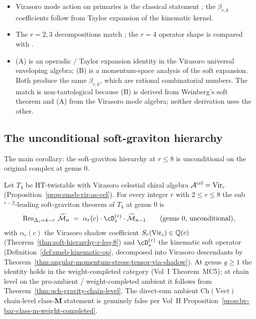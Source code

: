 \begin{remark}
\label{rem:smsb-hziv-ang-stress}
\begin{itemize}
\item[(A)] Virasoro mode action on primaries is the classical statement
\cite{DiFrancescoMathieuSenechal97}; the $\beta_{r, k}$ coefficients
follow from Taylor expansion of the kinematic kernel.
\item[(B)] The $r = 2, 3$ decompositions match
\cite{Weinberg65,CachazoStrominger14,StromingerLectures2018};
the $r = 4$ operator shape is compared with
\cite{HamadaShiuSubsubSoft}.
\item[(C)] (A) is an operadic / Taylor expansion identity in the
Virasoro universal enveloping algebra; (B) is a momentum-space analysis
of the soft expansion. Both produce the same $\beta_{r, k}$, which are
rational combinatorial numbers. The match is non-tautological because
(B) is derived from Weinberg's soft theorem and (A) from the Virasoro
mode algebra; neither derivation uses the other.
\end{itemize}
\end{remark}

\subsection{The unconditional soft-graviton hierarchy}
\label{subsec:smsb-unconditional}

The main corollary: the soft-graviton hierarchy at $r \leq
8$ is unconditional on the original complex at genus $0$.

\begin{corollary}
\label{cor:soft-hierarchy-unconditional-r-leq-8}
\ClaimStatusProvedHere
Let $T_4$ be HT-twistable with Virasoro celestial chiral algebra
$\mathcal A^{\mathrm{cel}} = \mathrm{Vir}_c$
(Proposition~\ref{prop:smsb-vir-as-cel}). For every integer $r$ with
$2 \leq r \leq 8$ the sub${}^{r - 2}$-leading soft-graviton theorem of
$T_4$ at genus $0$ is
\[
 \Res_{\Delta_s = 4 - r}\,\Mel\cM_n
 \;=\;
 \alpha_r(c)\cdot \cD_s^{(r)}\cdot \Mel\cM_{n - 1}
 \qquad
 (\text{genus 0, unconditional}),
\]
with $\alpha_r(c)$ the Virasoro shadow coefficient
$S_r(\mathrm{Vir}_c) \in \mathbb Q(c)$
(Theorem~\ref{thm:soft-hierarchy-r-leq-8}) and $\cD_s^{(r)}$ the
kinematic soft operator
(Definition~\ref{def:smsb-kinematic-op},
decomposed into Virasoro descendants by
Theorem~\ref{thm:angular-momentum-stress-tensor-via-shadow}). At
genus $g \geq 1$ the identity holds in the weight-completed category
(Vol~I Theorem~MC5); at chain level on the pro-ambient /
weight-completed ambient it follows from
Theorem~\ref{thm:uch-gravity-chain-level}. The direct-sum ambient
$\mathrm{Ch}(\mathrm{Vect})$ chain-level class-$\mathbf M$ statement
is genuinely false per Vol~II
Proposition~\ref{prop:bv-bar-class-m-weight-completed}.
\end{corollary}


